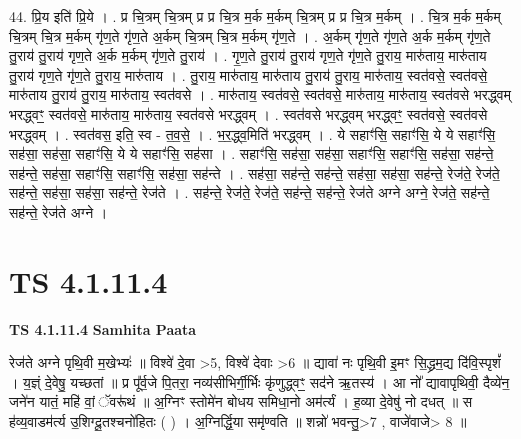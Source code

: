 \documentclass[17pt]{extarticle}
\begin{document}
44. प्रि॒य इति॑ प्रि॒ये । . प्र चि॒त्रम् चि॒त्रम् प्र प्र चि॒त्र म॒र्क म॒र्कम् चि॒त्रम् प्र प्र चि॒त्र म॒र्कम् । . चि॒त्र म॒र्क म॒र्कम् चि॒त्रम् चि॒त्र म॒र्कम् गृ॑ण॒ते गृ॑ण॒ते अ॒र्कम् चि॒त्रम् चि॒त्र म॒र्कम् गृ॑ण॒ते । . अ॒र्कम् गृ॑ण॒ते गृ॑ण॒ते अ॒र्क म॒र्कम् गृ॑ण॒ते तु॒राय॑ तु॒राय॑ गृण॒ते अ॒र्क म॒र्कम् गृ॑ण॒ते तु॒राय॑ । . गृ॒ण॒ते तु॒राय॑ तु॒राय॑ गृण॒ते गृ॑ण॒ते तु॒राय॒ मारु॑ताय॒ मारु॑ताय तु॒राय॑ गृण॒ते गृ॑ण॒ते तु॒राय॒ मारु॑ताय । . तु॒राय॒ मारु॑ताय॒ मारु॑ताय तु॒राय॑ तु॒राय॒ मारु॑ताय॒ स्वत॑वसे॒ स्वत॑वसे॒ मारु॑ताय तु॒राय॑ तु॒राय॒ मारु॑ताय॒ स्वत॑वसे । . मारु॑ताय॒ स्वत॑वसे॒ स्वत॑वसे॒ मारु॑ताय॒ मारु॑ताय॒ स्वत॑वसे भरद्ध्वम् भरद्ध्वꣳ॒॒ स्वत॑वसे॒ मारु॑ताय॒ मारु॑ताय॒ स्वत॑वसे भरद्ध्वम् । . स्वत॑वसे भरद्ध्वम् भरद्ध्वꣳ॒॒ स्वत॑वसे॒ स्वत॑वसे भरद्ध्वम् । . स्वत॑वस॒ इति॒ स्व - त॒व॒से॒ । . भ॒र॒द्ध्व॒मिति॑ भरद्ध्वम् । . ये सहाꣳ॑सि॒ सहाꣳ॑सि॒ ये ये सहाꣳ॑सि॒ सह॑सा॒ सह॑सा॒ सहाꣳ॑सि॒ ये ये सहाꣳ॑सि॒ सह॑सा । . सहाꣳ॑सि॒ सह॑सा॒ सह॑सा॒ सहाꣳ॑सि॒ सहाꣳ॑सि॒ सह॑सा॒ सह॑न्ते॒ सह॑न्ते॒ सह॑सा॒ सहाꣳ॑सि॒ सहाꣳ॑सि॒ सह॑सा॒ सह॑न्ते । . सह॑सा॒ सह॑न्ते॒ सह॑न्ते॒ सह॑सा॒ सह॑सा॒ सह॑न्ते॒ रेज॑ते॒ रेज॑ते॒ सह॑न्ते॒ सह॑सा॒ सह॑सा॒ सह॑न्ते॒ रेज॑ते । . सह॑न्ते॒ रेज॑ते॒ रेज॑ते॒ सह॑न्ते॒ सह॑न्ते॒ रेज॑ते अग्ने अग्ने॒ रेज॑ते॒ सह॑न्ते॒ सह॑न्ते॒ रेज॑ते अग्ने । \newline
\pagebreak
{}

\section{ TS 4.1.11.4 }

\textbf{TS 4.1.11.4 } \newline
\textbf{Samhita Paata} \newline

रेज॑ते अग्ने पृथि॒वी म॒खेभ्यः॑ ॥ विश्वे॑ दे॒वा >5, विश्वे॑ देवाः >6 ॥ द्यावा॑ नः पृथि॒वी इ॒मꣳ सि॒द्ध्रम॒द्य दि॑वि॒स्पृशं᳚ । य॒ज्ञ्ं दे॒वेषु॒ यच्छतां ॥ प्र पू᳚र्व॒जे पि॒तरा॒ नव्य॑सीभिर्गी॒र्भिः कृ॑णुद्ध्वꣳ॒॒ सद॑ने ऋ॒तस्य॑ । आ नो᳚ द्यावापृथिवी॒ दैव्ये॑न॒ जने॑न यातं॒ महि॑ वां॒ ॅवरू॑थं ॥ अ॒ग्निꣳ स्तोमे॑न बोधय समिधा॒नो अम॑र्त्यं । ह॒व्या दे॒वेषु॑ नो दधत् ॥ स ह॑व्य॒वाडम॑र्त्य उ॒शिग्दू॒तश्चनो॑हितः ( ) । अ॒ग्निर्द्धि॒या समृ॑ण्वति ॥ शन्नो॑ भवन्तु॒>7 , वाजे॑वाजे> 8 ॥ \newline
\end{document}
